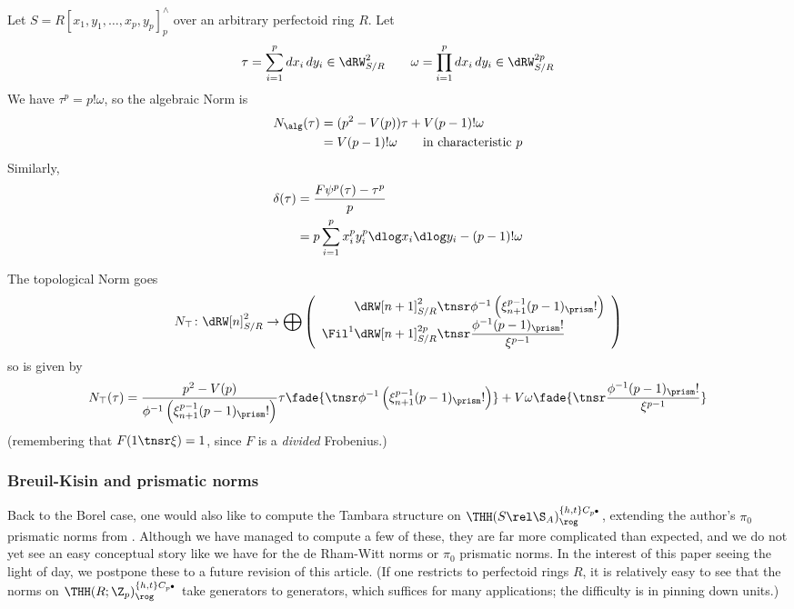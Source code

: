\begin{example}
  \label{ex:norm-even}
  Let $S=R[x_1, y_1, \dotsc, x_p, y_p]^\land_p$ over an arbitrary perfectoid ring $R$. Let
  \[
    \tau = \sum_{i=1}^p d x_i\, d y_i \in \dRW^2_{S/R} \qquad
    \omega = \prod_{i=1}^p d x_i\, d y_i \in \dRW^{2p}_{S/R}
  \]
  We have $\tau^p = p!\omega$, so the algebraic Norm is
  \begin{align*}
    N_\alg(\tau)
      &= (p^2-V(p))\tau + V(p-1)!\omega\\
      &= V(p-1)!\omega \qquad\text{in characteristic $p$}
  \end{align*}
  Similarly,
  \begin{align*}
    \delta(\tau)
    &=
    \frac{F\psi^p(\tau) - \tau^p}p\\
    &= p\sum_{i=1}^p x_i^p y_i^p \dlog x_i \dlog y_i - (p-1)!\omega
  \end{align*}

  The topological Norm goes
  \[
    N_\top\colon
    \dRW[n]^2_{S/R}
    \to
    \bigoplus\left(
      \begin{array}{r@{}l}
      \dRW[n+1]^2_{S/R} &{}\tnsr \phi^{-1}\left(\xi_{n+1}^{p-1}(p-1)_\prism!\right)\\
      \Fil^1 \dRW[n+1]^{2p}_{S/R} &{}\tnsr \dfrac{\phi^{-1}(p-1)_\prism!}{\xi^{p-1}}
    \end{array}\right)
  \]
  so is given by
  \[
    N_\top(\tau) =
    \frac
      {p^2-V(p)}
      {\phi^{-1}\left(\xi_{n+1}^{p-1}(p-1)_\prism!\right)}
    \tau \fade{{}\tnsr \phi^{-1}\left(\xi_{n+1}^{p-1}(p-1)_\prism!\right)}
    +
    V\omega \fade{{}\tnsr\dfrac{\phi^{-1}(p-1)_\prism!}{\xi^{p-1}}} 
  \]
  (remembering that $F(1\tnsr\xi) = 1$, since $F$ is a \emph{divided} Frobenius.)
\end{example}

\subsubsection{Breuil-Kisin and prismatic norms}

Back to the Borel case, one would also like to compute the Tambara structure on $\THH(S\rel\S_A)^{\{h,t\}C_{p^\bullet}}_\rog$, extending the author's $\pi_0$ prismatic norms from \cite{PrismsTambara1}. Although we have managed to compute a few of these, they are far more complicated than expected, and we do not yet see an easy conceptual story like we have for the de Rham-Witt norms or $\pi_0$ prismatic norms. In the interest of this paper seeing the light of day, we postpone these to a future revision of this article. (If one restricts to perfectoid rings $R$, it is relatively easy to see that the norms on $\THH(R;\Z_p)^{\{h,t\}C_{p^\bullet}}_\rog$ take generators to generators, which suffices for many applications; the difficulty is in pinning down units.)

